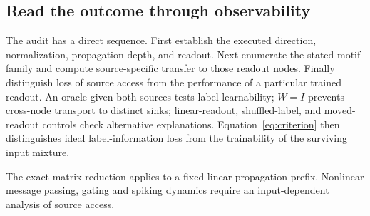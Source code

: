 \subsection{Read the outcome through observability}
\label{sec:controls}

The audit has a direct sequence. First establish the executed direction,
normalization, propagation depth, and readout. Next enumerate the stated
motif family and compute source-specific transfer to those readout nodes.
Finally distinguish loss of source access from the performance of a
particular trained readout. An oracle given both sources tests label
learnability; $W=I$ prevents cross-node transport to distinct sinks;
linear-readout, shuffled-label, and moved-readout controls check alternative
explanations. Equation~\eqref{eq:criterion} then distinguishes ideal label-information
loss from the trainability of the surviving input mixture.

The exact matrix reduction applies to a fixed linear propagation prefix.
Nonlinear message passing, gating and spiking dynamics require an
input-dependent analysis of source access.
